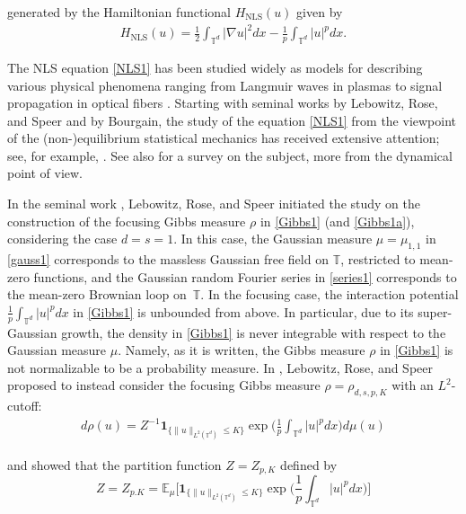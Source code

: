 \documentclass[letterpaper, 11pt,  reqno]{amsart}
\newcommand{\noi}{\noindent}
\newcommand{\T}{\mathbb{T}}
\newcommand{\E}{\mathbb{E}}
\newcommand{\nb}{\nabla}
\newcommand{\ind}{\mathbf 1}
\numberwithin{equation}{section}
\numberwithin{theorem}{section}
\begin{document}
\noi
generated by the Hamiltonian functional $H_\text{NLS}(u)$ given by 
\begin{align*}
H_\text{NLS}(u) = \frac 12\int_{\T^d} |\nb u|^2 d x - \frac 1 p\int_{\T^d} |u|^p d x.
\end{align*}

\noi
The NLS equation \eqref{NLS1}
 has been studied widely as models for describing  
 various  physical phenomena ranging from Langmuir waves in plasmas to signal propagation in optical fibers \cite{SS, KMM, Agrawal}. 
Starting with  seminal works
\cite{LRS} by Lebowitz, Rose, and Speer
and 
\cite{BO94, BO96} by Bourgain, 
the study of the equation \eqref{NLS1}
 from the viewpoint of the (non-)equilibrium statistical mechanics 
 has received extensive  attention;
 see, for example, 
 \cite{BO97,Tzv1,  Tzv2, OQV, LMW, BBulut, 
CFL, DNY2, FOW}.
See also \cite{BOP4} for a survey on the subject, more from the dynamical point of view.


\noi






In the seminal work \cite{LRS}, 
Lebowitz, Rose, and Speer initiated the study 
on the construction of the focusing Gibbs measure
$\rho$ in \eqref{Gibbs1} (and \eqref{Gibbs1a}), 
considering the case $d = s = 1$.
In this case, 
the Gaussian measure $\mu = \mu_{1, 1}$ in \eqref{gauss1} corresponds to the massless
Gaussian free field on $\T$, 
restricted to mean-zero functions, 
and the Gaussian random Fourier series in \eqref{series1}
corresponds to the mean-zero Brownian loop on~$\T$.
In the focusing case, the interaction potential 
$\frac{1}{p} \int_{\mathbb{T}^d} |u|^p dx$ in \eqref{Gibbs1}
is unbounded from above.
In particular,  due to its super-Gaussian growth, 
the density in \eqref{Gibbs1}
is never integrable with respect to the Gaussian measure $\mu$.
Namely, as it is written, the Gibbs measure $\rho$ in \eqref{Gibbs1}
is not normalizable to be a probability measure.
In \cite{LRS}, 
Lebowitz, Rose, and Speer proposed
to instead consider the focusing Gibbs measure 
$\rho = \rho_{d, s, p, K}$
with an $L^2$-cutoff:
\begin{align}
d\rho (u) = Z^{-1}
\ind_{\{\|u\|_{L^2(\mathbb{T}^d)}\le K\}}
\exp \bigg(\frac{1}{p} \int_{\mathbb{T}^d} |u|^p dx \bigg) d\mu (u)
\label{Gibbs2}
\end{align}

\noi
and showed that 
the partition function $Z = Z_{p, K}$
defined by 
\[
Z = Z_{p. K} = \E_\mu \bigg[\ind_{\{\|u\|_{L^2(\mathbb{T}^d)}\le K\}}
\exp \bigg(\frac{1}{p} \int_{\mathbb{T}^d} |u|^p dx \bigg) \bigg]\]
\end{document}
